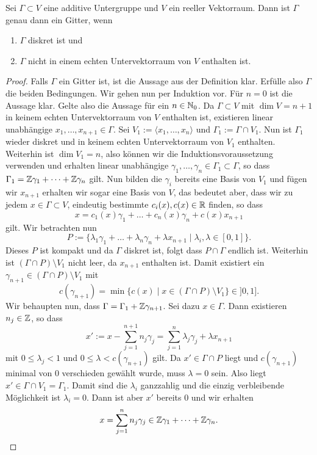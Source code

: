 \begin{lemma}
  \label{lemma:gitter}
  Sei $\Gamma \subset V$ eine additive Untergruppe und $V$ ein reeller
  Vektorraum. Dann ist $\Gamma$ genau dann ein Gitter, wenn
  \begin{enumerate}
  \item $\Gamma$ diskret ist und
  \item $\Gamma$ nicht in einem echten Untervektorraum von $V$
    enthalten ist.
  \end{enumerate}
\end{lemma}

\begin{proof}
  Falls $\Gamma$ ein Gitter ist, ist die Aussage aus der Definition
  klar. Erfülle also $\Gamma$ die beiden Bedingungen. Wir gehen nun
  per Induktion vor. Für $n = 0$ ist die Aussage klar. Gelte also die
  Aussage für ein $n \in \mathbb{N}_0$. Da $\Gamma \subset V$ mit $\dim V =
  n+1$ in keinem echten
  Untervektorraum von $V$ enthalten ist, existieren linear unabhängige $x_1, \dots,
  x_{n+1} \in \Gamma$. Sei $V_1 := \langle x_1, \dots, x_n \rangle$
  und $\Gamma_1 := \Gamma \cap V_1$. Nun ist $\Gamma_1$ wieder diskret
  und in keinem echten Untervektorraum von $V_1$ enthalten. Weiterhin
  ist $\dim V_1 = n$, also können wir die Induktionsvoraussetzung
  verwenden und erhalten linear unabhängige $\gamma_1, \dots, \gamma_n
  \in \Gamma_1 \subset \Gamma$, so dass $\Gamma_1 = \mathbb{Z} \gamma_1 +
  \dots + \mathbb{Z} \gamma_n$ gilt. Nun bilden die $\gamma_i$ bereits eine
  Basis von $V_1$ und fügen wir $x_{n+1}$ erhalten wir sogar eine Basis
  von $V$, das bedeutet aber, dass wir zu jedem $x \in \Gamma \subset
  V$, eindeutig bestimmte $c_i(x), c(x) \in \mathbb{R}$ finden, so dass
  \[
  x = c_1(x) \gamma_1 + \dots + c_n(x) \gamma_n + c(x) x_{n+1}
  \]
  gilt. Wir betrachten nun
  \[
  P := \{ \lambda_1 \gamma_1 + \dots + \lambda_n \gamma_n + \lambda
  x_{n+1} \mid \lambda_i, \lambda \in [0,1] \}.
  \]
  Dieses $P$ ist kompakt und da $\Gamma$ diskret ist, folgt dass $P
  \cap \Gamma$ endlich ist. Weiterhin ist $( \Gamma \cap P) \setminus
  V_1$ nicht leer, da $x_{n+1}$ enthalten ist. Damit existiert ein
  $\gamma_{n+1} \in ( \Gamma \cap P) \setminus V_1$ mit
  \[
  c(\gamma_{n+1}) = \min \{ c(x) \mid x \in ( \Gamma \cap P ) \setminus
  V_1 \} \in ]0, 1].
  \]
  Wir behaupten nun, dass $\Gamma = \Gamma_1 + \mathbb{Z} \gamma_{n+1}$. Sei
  dazu $x \in \Gamma$. Dann existieren $n_j \in \mathbb{Z}$, so dass
  \[
  x' := x - \sum_{j=1}^{n+1} n_j \gamma_j = \sum_{j=1}^n \lambda_j
  \gamma_j + \lambda x_{n+1}
  \]
  mit $0 \leq \lambda_j < 1$ und $0 \leq \lambda < c(\gamma_{n+1})$
  gilt. Da $x' \in \Gamma \cap P$ liegt und $c(\gamma_{n+1})$ minimal
  von 0 verschieden gewählt wurde, muss $\lambda = 0$ sein. Also liegt
  $x' \in \Gamma \cap V_1 = \Gamma_1$. Damit sind die $\lambda_i$
  ganzzahlig und die einzig verbleibende Möglichkeit ist $\lambda_i =
  0$. Dann ist aber $x'$ bereits 0 und wir erhalten 
  \[
  x = \sum_{j=1}^n n_j \gamma_j \in \mathbb{Z} \gamma_1 + \dots + \mathbb{Z} \gamma_n.
  \]
\end{proof}

